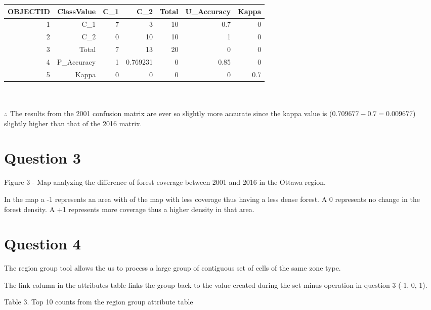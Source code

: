 \documentclass[fleqn, 12pt]{article}
\begin{document}
\begin{tabular}{rrrrrrr}
    \hline
        OBJECTID & ClassValue & C\_1 & C\_2 & Total & U\_Accuracy & Kappa \\\hline
        1 & C\_1 & 7 & 3 & 10 & 0.7 & 0 \\
        2 & C\_2 & 0 & 10 & 10 & 1 & 0\\
        3 & Total & 7 & 13 & 20 & 0 & 0\\
        4 & P\_Accuracy & 1 & 0.769231 & 0 & 0.85 & 0\\
        5 & Kappa & 0 & 0 & 0 & 0 & 0.7\\
    \hline
\end{tabular}\\\\

$\therefore$ The results from the 2001 confusion matrix are ever so slightly more accurate since the kappa value is ($0.709677-0.7=0.009677$) slightly higher than that of the 2016 matrix.

\section*{Question 3}

\begin{center}
    Figure 3 - Map analyzing the difference of forest coverage between 2001 and 2016 in the Ottawa region.
\end{center}

In the map a -1 represents an area with of the map with less coverage thus having a less dense forest. A 0 represents no change in the forest density. A +1 represents more coverage thus a higher density in that area.

\section*{Question 4}

The region group tool allows the us to process a large group of contiguous set of cells of the same zone type.

The link column in the attributes table links the group back to the value created during the set minus operation in question 3 (-1, 0, 1).

\newpage

Table 3. Top 10 counts from the region group attribute table\\
\end{document}
